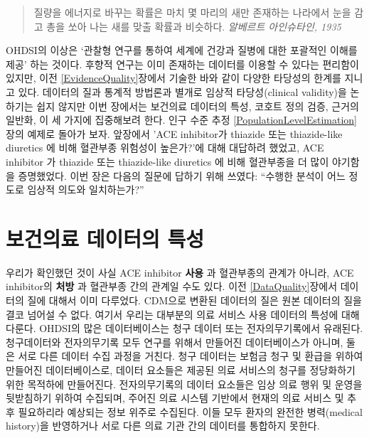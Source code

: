 \documentclass[10.5pt]{book}
\theoremstyle{definition}
\theoremstyle{definition}
\theoremstyle{definition}
\theoremstyle{remark}
\begin{document}
\begin{quote}
질량을 에너지로 바꾸는 확률은 마치 몇 마리의 새만 존재하는 나라에서 눈을
감고 총을 쏘아 나는 새를 맞출 확률과 비슷하다. \emph{알베르트
아인슈타인, 1935}
\end{quote}

OHDSI의 이상은 `관찰형 연구를 통하여 세계에 건강과 질병에 대한 포괄적인
이해를 제공' 하는 것이다. 후향적 연구는 이미 존재하는 데이터를 이용할 수
있다는 편리함이 있지만, 이전 \ref{EvidenceQuality}장에서 기술한 바와
같이 다양한 타당성의 한계를 지니고 있다. 데이터의 질과 통계적 방법론과
별개로 임상적 타당성(clinical validity)을 논하기는 쉽지 않지만 이번
장에서는 보건의료 데이터의 특성, 코호트 정의 검증, 근거의 일반화, 이 세
가지에 집중해보려 한다. 인구 수준 추정
\ref{PopulationLevelEstimation}장의 예제로 돌아가 보자. 앞장에서 'ACE
inhibitor가 thiazide 또는 thiazide-like diuretics 에 비해 혈관부종
위험성이 높은가?'에 대해 대답하려 했었고, ACE inhibitor 가 thiazide 또는
thiazide-like diuretics 에 비해 혈관부종을 더 많이 야기함을 증명했었다.
이번 장은 다음의 질문에 답하기 위해 쓰였다: ``수행한 분석이 어느 정도로
임상적 의도와 일치하는가?'' 

\section{보건의료 데이터의 특성}\label{CharacteristicsOfDatabase}

우리가 확인했던 것이 사실 ACE inhibitor \textbf{사용} 과 혈관부종의
관계가 아니라, ACE inhibitor의 \textbf{처방} 과 혈관부종 간의 관계일
수도 있다. 이전 \ref{DataQuality}장에서 데이터의 질에 대해서 이미
다루었다. CDM으로 변환된 데이터의 질은 원본 데이터의 질을 결코 넘어설 수
없다. 여기서 우리는 대부분의 의료 서비스 사용 데이터의 특성에 대해
다룬다. OHDSI의 많은 데이터베이스는 청구 데이터 또는 전자의무기록에서
유래된다. 청구데이터와 전자의무기록 모두 연구를 위해서 만들어진
데이터베이스가 아니며, 둘은 서로 다른 데이터 수집 과정을 거친다. 청구
데이터는 보험금 청구 및 환급을 위하여 만들어진 데이터베이스로, 데이터
요소들은 제공된 의료 서비스의 청구를 정당화하기 위한 목적하에
만들어진다. 전자의무기록의 데이터 요소들은 임상 의료 행위 및 운영을
뒷받침하기 위하여 수집되며, 주어진 의료 시스템 기반에서 현재의 의료
서비스 및 추후 필요하리라 예상되는 정보 위주로 수집된다. 이들 모두
환자의 완전한 병력(medical history)을 반영하거나 서로 다른 의료 기관
간의 데이터를 통합하지 못한다.
\end{document}
